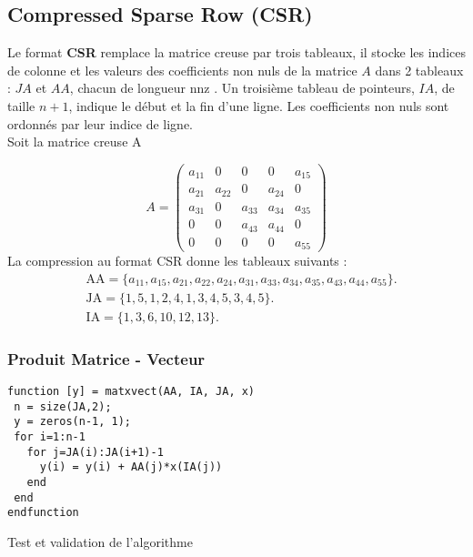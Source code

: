 \documentclass[12pt]{report}
\begin{document}
\subsection{Compressed Sparse Row (CSR)}

Le format \textbf{CSR} remplace la matrice creuse par trois tableaux, il stocke les indices de colonne et les valeurs des coefficients non nuls de la matrice $A$ dans
2 tableaux : $JA$ et $AA$, chacun de longueur nnz . Un troisième tableau de pointeurs, $IA$, de
taille $n+1$, indique le début et la fin d’une ligne. Les coefficients non nuls sont ordonnés par leur indice de ligne.\\

Soit la matrice creuse A 

$$
A=\left(\begin{array}{ccccc}
a_{11} & 0 & 0 & 0 & a_{15} \\
a_{21} & a_{22} & 0 & a_{24} & 0 \\
a_{31} & 0 & a_{33} & a_{34} & a_{35} \\
0 & 0 & a_{43} & a_{44} & 0 \\
0 & 0 & 0 & 0 & a_{55}
\end{array}\right)
$$
La compression au format CSR donne les tableaux suivants :
$$
\begin{aligned}
&\mathrm{AA}=\{a_{11},a_{15},a_{21},a_{22},a_{24},a_{31},a_{33},a_{34},a_{35},a_{43},a_{44},a_{55}\} . \\
&\mathrm{JA}=\{1,5,1,2,4,1,3,4,5,3,4,5\} . \\
&\mathrm{IA}=\{1,3,6,10,12,13\} .
\end{aligned}
$$

\subsubsection{Produit Matrice - Vecteur}

\begin{lstlisting}
function [y] = matxvect(AA, IA, JA, x)
 n = size(JA,2);
 y = zeros(n-1, 1);
 for i=1:n-1
   for j=JA(i):JA(i+1)-1 
     y(i) = y(i) + AA(j)*x(IA(j))
   end
 end
endfunction

\end{lstlisting}

Test et validation de l'algorithme 
\end{document}
